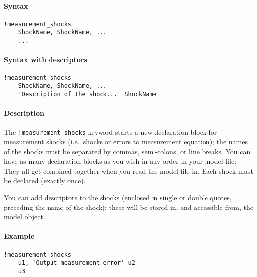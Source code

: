


	\paragraph{Syntax}\label{syntax}

\begin{verbatim}
!measurement_shocks
    ShockName, ShockName, ...
    ...
\end{verbatim}

\paragraph{Syntax with descriptors}\label{syntax-with-descriptors}

\begin{verbatim}
!measurement_shocks
    ShockName, ShockName, ...
    'Description of the shock...' ShockName
\end{verbatim}

\paragraph{Description}\label{description}

The \texttt{!measurement\_shocks} keyword starts a new declaration block
for measurement shocks (i.e.~shocks or errors to measurement equation);
the names of the shocks must be separated by commas, semi-colons, or
line breaks. You can have as many declaration blocks as you wish in any
order in your model file: They all get combined together when you read
the model file in. Each shock must be declared (exactly once).

You can add descriptors to the shocks (enclosed in single or double
quotes, preceding the name of the shock); these will be stored in, and
accessible from, the model object.

\paragraph{Example}\label{example}

\begin{verbatim}
!measurement_shocks
    u1, 'Output measurement error' u2
    u3
\end{verbatim}


